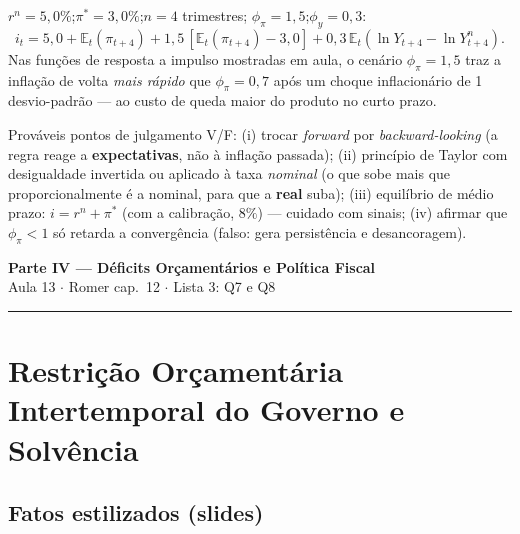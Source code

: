 \documentclass[12pt, a4paper]{article}
\newcommand{\E}{\mathbb{E}}
\begin{document}
\begin{resultbox}[title={Calibração citada em aula (linha do BCB, Relatórios Trimestrais)}]
$r^n = 5{,}0\%$;\quad $\pi^* = 3{,}0\%$;\quad $n = 4$ trimestres;\quad
$\phi_\pi = 1{,}5$;\quad $\phi_y = 0{,}3$:
\[
i_t = 5{,}0 + \E_t(\pi_{t+4})
      + 1{,}5\,[\E_t(\pi_{t+4}) - 3{,}0]
      + 0{,}3\,\E_t(\ln Y_{t+4} - \ln Y^n_{t+4}).
\]
Nas funções de resposta a impulso mostradas em aula, o cenário $\phi_\pi=1{,}5$
traz a inflação de volta \emph{mais rápido} que $\phi_\pi=0{,}7$ após um choque
inflacionário de 1 desvio-padrão --- ao custo de queda maior do produto no
curto prazo.
\end{resultbox}

\begin{provabox}[title={Como cai na prova}]
Prováveis pontos de julgamento V/F: (i) trocar \emph{forward} por
\emph{backward-looking} (a regra reage a \textbf{expectativas}, não à inflação
passada); (ii) princípio de Taylor com desigualdade invertida ou aplicado à
taxa \emph{nominal} (o que sobe mais que proporcionalmente é a nominal, para
que a \textbf{real} suba); (iii) equilíbrio de médio prazo:
$i = r^n + \pi^*$ (com a calibração, $8\%$) --- cuidado com sinais; (iv)
afirmar que $\phi_\pi<1$ só retarda a convergência (falso: gera persistência e
desancoragem).
\end{provabox}

\newpage
\begin{center}
{\LARGE\bfseries\color{orangerbc} Parte IV --- Déficits Orçamentários e Política Fiscal}\\[0.2em]
{\normalsize\color{grayrbc} Aula 13 $\cdot$ Romer cap.\ 12 $\cdot$ Lista 3: Q7 e Q8}\\[0.2em]
\rule{\linewidth}{0.8pt}
\end{center}

\section{Restrição Orçamentária Intertemporal do Governo e Solvência}

\subsection{Fatos estilizados (slides)}
\end{document}
